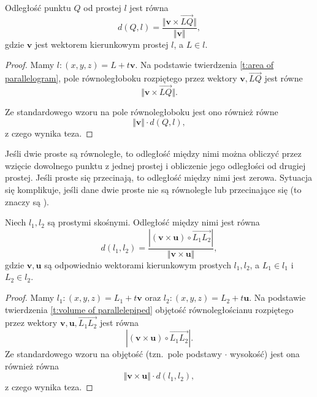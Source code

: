 \begin{theorem}
    Odległość punktu $Q$ od prostej $l$ jest równa
    \[ d(Q, l) = \frac{\Vert \mathbf{v} \times \overrightarrow{LQ}\Vert}{\Vert\mathbf{v}\Vert}, \]
    gdzie $\mathbf{v}$ jest wektorem kierunkowym prostej $l$, a $L \in l$.
\end{theorem}
\begin{proof}
    Mamy $l : (x, y, z) = L + t\mathbf{v}$. Na podstawie twierdzenia \ref{t:area of parallelogram}, pole równoległoboku rozpiętego przez wektory $\mathbf{v}, \overrightarrow{LQ}$ jest równe
    \[ \Vert \mathbf{v} \times \overrightarrow{LQ} \Vert. \]
    \begin{center}
    \end{center}
    Ze standardowego wzoru na pole równoległoboku jest ono również równe
    \[ \Vert \mathbf{v} \Vert \cdot d(Q, l), \]
    z czego wynika teza.
\end{proof}

Jeśli dwie proste są równoległe, to odległość między nimi można obliczyć przez wzięcie dowolnego punktu z jednej prostej i obliczenie jego odległości od drugiej prostej. Jeśli proste się przecinają, to odległość między nimi jest zerowa. Sytuacja się komplikuje, jeśli dane dwie proste nie są równoległe lub przecinające się (to znaczy są ).

\begin{theorem}
    \label{t:distance between lines}
    Niech $l_1, l_2$ są prostymi skośnymi. Odległość między nimi jest równa
    \[ d(l_1, l_2) = \frac{|(\mathbf{v} \times \mathbf{u}) \circ \overrightarrow{L_1L_2}|}{\Vert\mathbf{v}\times\mathbf{u}\Vert}, \]
    gdzie $\mathbf{v}, \mathbf{u}$ są odpowiednio wektorami kierunkowym prostych $l_1, l_2$, a $L_1 \in l_1$ i $L_2 \in l_2$.
\end{theorem}
\begin{proof}
    Mamy $l_1 : (x, y, z) = L_1 + t\mathbf{v}$ oraz $l_2 : (x, y, z) = L_2 + t\mathbf{u}$. Na podstawie twierdzenia \ref{t:volume of parallelepiped} objętość równoległościanu rozpiętego przez wektory $\mathbf{v}, \mathbf{u}, \overrightarrow{L_1L_2}$ jest równa
    \[ |(\mathbf{v} \times \mathbf{u}) \circ \overrightarrow{L_1L_2}|. \]
    Ze standardowego wzoru na objętość (tzn.\ pole podstawy $\cdot$ wysokość) jest ona również równa
    \[ \Vert\mathbf{v}\times\mathbf{u}\Vert \cdot d(l_1, l_2), \]
    z czego wynika teza.
\end{proof}

